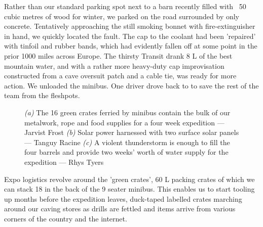 Rather than our standard parking spot next to a barn recently filled with ~50 cubic metres of wood for winter, we parked on the road surrounded by only concrete. Tentatively approaching the still smoking bonnet with fire-extinguisher in hand, we quickly located the fault. The cap to the coolant had been 'repaired' with tinfoil and rubber bands, which had evidently fallen off at some point in the prior 1000 miles across Europe. The thirsty Transit drank 8 L of the best mountain water, and with a rather more heavy-duty cap improvisation constructed from a cave oversuit patch and a cable tie, was ready for more action. We unloaded the minibus. One driver drove back to  to save the rest of the team from the fleshpots. 

\begin{figure*}[t!]
\checkoddpage \ifoddpage \forcerectofloat \else \forceversofloat \fi
\centering
    \begin{subfigure}[t]{0.413\textwidth}
        \centering
        \caption{} \label{ben with crates}
    \end{subfigure}
        \hfill
\begin{subfigure}[t]{0.577\textwidth}
\centering
{}
 \caption{}\label{solar panels}
\end{subfigure}
\vfill
\begin{subfigure}[t]{\textwidth}
\centering
{}
 \caption{}\label{full barrel}
\end{subfigure}
  \caption{
    \emph{(a)} The 16 green crates ferried by minibus contain the bulk of our metalwork, rope and food supplies for a four week expedition --- Jarvist Frost
     \emph{(b)}  Solar power harnessed with two surface solar panels --- Tanguy Racine
     \emph{(c)}  A violent thunderstorm is enough to fill the four barrels and provide two weeks' worth of water supply for the expedition ---  Rhys Tyers}
\end{figure*}


Expo logistics revolve around the 'green crates', 60 L packing crates of which we can stack 18 in the back of the 9 seater minibus. This enables us to start tooling up months before the expedition leaves, duck-taped labelled crates marching around our caving stores as drills are fettled and items arrive from various corners of the country and the internet. 

